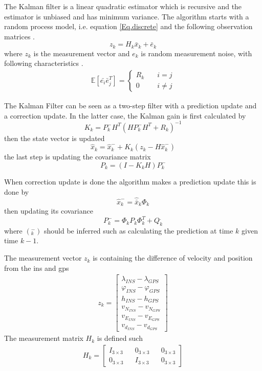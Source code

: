 The Kalman filter is a linear quadratic estimator which is recursive and the estimator is unbiased and has minimum variance. The algorithm starts with a random process model, i.e. equation \eqref{Eq.discrete} and the following observation matrices \cite{Discrete_kalman}.
\begin{equation}
z_k = H_k\bar{x}_k + \bar{e}_k
\end{equation}
where $z_k$ is the measurement vector and $e_k$ is random measurement noise, with following characteristics \cite{signal_process}.
\begin{align}
\mathbb{E}[\bar{e_i}\bar{e}_j^T] =
\begin{cases}
  R_k &\quad i=j\\    
  0 &\quad i\neq j   
\end{cases}
\end{align}

The Kalman Filter can be seen as a two-step filter with a prediction update and a correction update. In the latter case, the Kalman gain is first calculated by
\begin{equation}
K_k = P_k^-H^T(HP_k^-H^T+R_k)^{-1}
\end{equation}
then the state vector is updated
\begin{equation}
\hat{x}_k = \hat{x}_k^- + K_k(z_k-H\hat{x}_k^-)
\end{equation}
the last step is updating the covariance matrix
\begin{equation}
P_k = (I-K_kH)P_k^-
\end{equation}

When correction update is done the algorithm makes a prediction update this is done by 
\begin{equation}
\hat{x}_k^- = \hat{\bar{x}}_k\Phi_k
\end{equation}
then updating its covariance
\begin{equation}
P_k^- = \Phi_k P_k \Phi_k^T + Q_k^.
\end{equation}
where $(_k^-)$ should be inferred such as calculating the prediction at time $k$ given time $k-1$.

The measurement vector $z_k$ is containing the difference of velocity and position from the \gls{ins} and \gls{gps}
\begin{align}
z_k =
\begin{bmatrix}
\lambda_{INS} - \lambda_{GPS} \\
\varphi_{INS} - \varphi_{GPS} \\
h_{INS} - h_{GPS} \\
v_{N_{INS}} - v_{N_{GPS}} \\
v_{E_{INS}} - v_{E_{GPS}} \\
v_{d_{INS}} - v_{d_{GPS}}
\end{bmatrix}
\end{align}
The measurement matrix $H_k$ is defined such
\begin{align}
H_k = 
\begin{bmatrix}
I_{3\times 3} && 0_{3 \times 3} && 0_{3 \times 3} \\
0_{3 \times 3} && I_{3\times 3} && 0_{3 \times 3}
\end{bmatrix}
\end{align}


